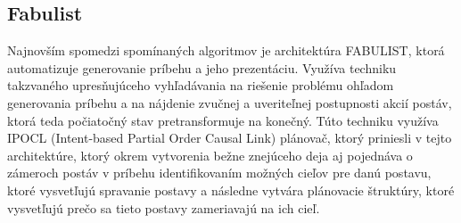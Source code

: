 \subsection{Fabulist}
Najnovším spomedzi spomínaných algoritmov je architektúra FABULIST\cite{fabulist}, ktorá automatizuje generovanie príbehu a jeho prezentáciu. Využíva techniku takzvaného upresňujúceho vyhľadávania na riešenie problému ohľadom generovania príbehu a na nájdenie zvučnej a uveriteľnej postupnosti akcií postáv, ktorá teda počiatočný stav pretransformuje na konečný. Túto techniku využíva IPOCL (Intent-based Partial Order Causal Link) plánovač, ktorý priniesli v tejto architektúre, ktorý okrem vytvorenia bežne znejúceho deja aj pojednáva o zámeroch postáv v príbehu identifikovaním možných cieľov pre danú postavu, ktoré vysvetľujú spravanie postavy a následne vytvára plánovacie štruktúry, ktoré vysvetľujú prečo sa tieto postavy zameriavajú na ich cieľ.
